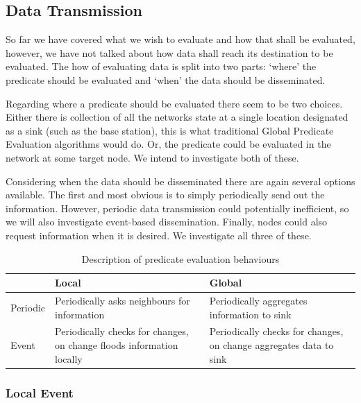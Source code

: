 \subsection{Data Transmission}

So far we have covered what we wish to evaluate and how that shall be evaluated, however, we have not talked about how data shall reach its destination to be evaluated. The how of evaluating data is split into two parts: `where' the predicate should be evaluated and `when' the data should be disseminated.

Regarding where a predicate should be evaluated there seem to be two choices. Either there is collection of all the networks state at a single location designated as a sink (such as the base station), this is what traditional Global Predicate Evaluation algorithms would do. Or, the predicate could be evaluated in the network at some target node. We intend to investigate both of these.

Considering when the data should be disseminated there are again several options available. The first and most obvious is to simply periodically send out the information. However, periodic data transmission could potentially inefficient, so we will also investigate event-based dissemination. Finally, nodes could also request information when it is desired. We investigate all three of these.

\begin{table}[H]
\centering
\begin{tabular}{| l | m{5cm} | m{5cm} |}
\hline
~ & Local & Global \\
\hline
Periodic & Periodically asks neighbours for information & Periodically aggregates information to sink \\
\hline
Event & Periodically checks for changes, on change floods information locally &  Periodically checks for changes, on change aggregates data to sink \\
\hline
\end{tabular}
\caption{Description of predicate evaluation behaviours}
\end{table}


\subsubsection{Local Event}

